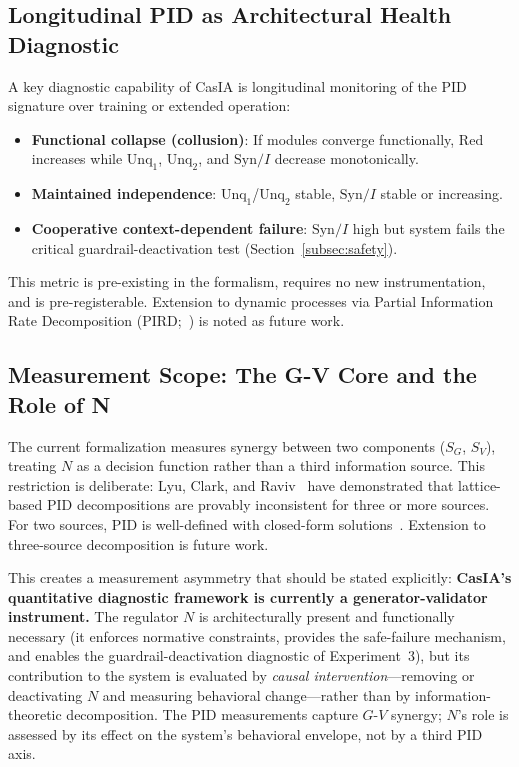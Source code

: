 \documentclass[11pt,a4paper]{article}
\theoremstyle{definition}
\begin{document}
\subsection{Longitudinal PID as Architectural Health Diagnostic}
\label{subsec:longitudinal}

A key diagnostic capability of CasIA is longitudinal monitoring of the PID signature over training or extended operation:
\begin{itemize}[leftmargin=*,itemsep=2pt]
\item \textbf{Functional collapse (collusion)}: If modules converge functionally, $\mathrm{Red}$ increases while $\mathrm{Unq}_1$, $\mathrm{Unq}_2$, and $\mathrm{Syn}/I$ decrease monotonically.
\item \textbf{Maintained independence}: $\mathrm{Unq}_1$/$\mathrm{Unq}_2$ stable, $\mathrm{Syn}/I$ stable or increasing.
\item \textbf{Cooperative context-dependent failure}: $\mathrm{Syn}/I$ high but system fails the critical guardrail-deactivation test (Section~\ref{subsec:safety}).
\end{itemize}

This metric is pre-existing in the formalism, requires no new instrumentation, and is pre-registerable. Extension to dynamic processes via Partial Information Rate Decomposition (PIRD;~\cite{faes2025pird}) is noted as future work.

\subsection{Measurement Scope: The G-V Core and the Role of N}
\label{subsec:threesource}

The current formalization measures synergy between two components ($S_G$, $S_V$), treating $N$ as a decision function rather than a third information source. This restriction is deliberate: Lyu, Clark, and Raviv~\cite{lyu2025multivariate} have demonstrated that lattice-based PID decompositions are provably inconsistent for three or more sources. For two sources, PID is well-defined with closed-form solutions~\cite{williams2010pid,bertschinger2014pid}. Extension to three-source decomposition is future work.

This creates a measurement asymmetry that should be stated explicitly: \textbf{CasIA's quantitative diagnostic framework is currently a generator-validator instrument.} The regulator $N$ is architecturally present and functionally necessary (it enforces normative constraints, provides the safe-failure mechanism, and enables the guardrail-deactivation diagnostic of Experiment~3), but its contribution to the system is evaluated by \emph{causal intervention}---removing or deactivating $N$ and measuring behavioral change---rather than by information-theoretic decomposition. The PID measurements capture $G$-$V$ synergy; $N$'s role is assessed by its effect on the system's behavioral envelope, not by a third PID axis.
\end{document}
